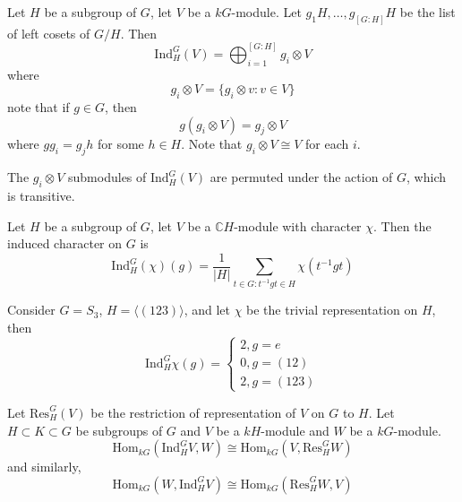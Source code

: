 \documentclass[openany]{book}
\newcommand{\C}{\mathbb{C}}
\newcommand{\la}{\langle}
\newcommand{\ra}{\rangle}
\begin{document}
\begin{defn}
    Let $H$ be a subgroup of $G$, let $V$ be a $kG$-module. Let $g_1H, \dots, g_{[G:H]}H$ be the list of left cosets of $G/H$. Then 
    \begin{equation*}
        \text{Ind}_H^G(V)=\bigoplus_{i=1}^{[G:H]}g_i\otimes V
    \end{equation*}
    where 
    \begin{equation*}
        g_i\otimes V=\{g_i\otimes v: v\in V\}
    \end{equation*}
    note that if $g\in G$, then 
    \begin{equation*}
        g(g_i\otimes V)=g_j\otimes V
    \end{equation*}
    where $gg_i=g_jh$ for some $h\in H$. Note that $g_i\otimes V\cong V$ for each $i$. 
\end{defn}
The $g_i\otimes V$ submodules of $\text{Ind}_H^G(V)$ are permuted under the action of $G$, which is transitive.


\begin{defn}
    Let $H$ be a subgroup of $G$, let $V$ be a $\C H$-module with character $\chi$. Then the induced character on $G$ is 
    \begin{equation*}
        \text{Ind}_H^G(\chi)(g)=\frac{1}{|H|}\sum_{t\in G: t^{-1}gt\in H}\chi(t^{-1}gt)
    \end{equation*}
\end{defn}

\begin{example}
    Consider $G=S_3$, $H=\la(123)\ra$, and let $\chi$ be the trivial representation on $H$, then 
    \begin{equation*}
        \text{Ind}_H^G\chi(g)=\begin{cases}
            2, g=e\\
            0, g=(12)\\
            2, g=(123)
        \end{cases}
    \end{equation*}
\end{example}

\begin{prop}
    Let $\text{Res}_H^G(V)$ be the restriction of representation of $V$ on $G$ to $H$. Let $H\subset K\subset G$ be subgroups of $G$ and $V$ be a $kH$-module and $W$ be a $kG$-module. 
    \begin{equation*}
        \text{Hom}_{kG}(\text{Ind}_H^GV,W)\cong\text{Hom}_{kG}(V,\text{Res}_H^GW)
    \end{equation*}
    and similarly, 
    \begin{equation*}
        \text{Hom}_{kG}(W,\text{Ind}_H^GV)\cong\text{Hom}_{kG}(\text{Res}_H^GW,V)
    \end{equation*}
\end{prop}
\end{document}
